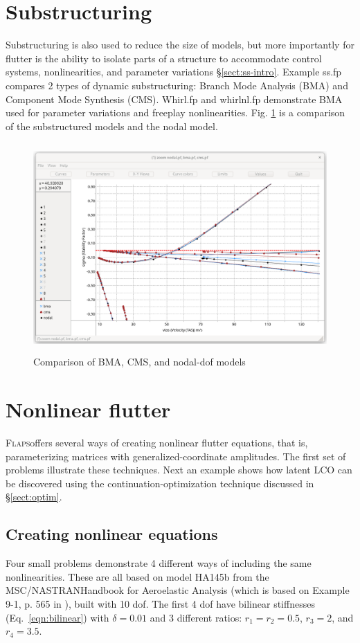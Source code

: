 \documentclass[11pt,openany,twoside]{book}
\numberwithin{equation}{section}		%
\newcommand{\Flaps}{\textsc{Flaps\:}}
\newcommand{\Nastran}{{\footnotesize{NASTRAN\:}}}
\newcommand{\Sectref}[1]{\S\ref{#1}}
\newcommand{\Eqn}[1]{Eq.\ \ref{#1}}  %
\newcommand{\Figref}[1]{Fig. \ref{#1}}  %
\begin{document}
\section{Substructuring}\label{ex:substructure}
Substructuring is also used to reduce the size of models, but more
importantly for flutter is the ability to isolate parts of a structure
to accommodate control systems, nonlinearities, and parameter variations
\Sectref{sect:ss-intro}.
Example ss.fp compares 2 types of dynamic substructuring: Branch Mode
Analysis (BMA) and Component Mode Synthesis (CMS).
Whirl.fp and whirlnl.fp demonstrate BMA used for parameter variations
and freeplay nonlinearities. \Figref{fig:ss-compare} is a comparison of the
substructured models and the nodal model.
\begin{figure}[ht]
		\includegraphics[height=8cm,width=12cm]{ss-compare.png}
	\centering
	\caption{Comparison of BMA, CMS, and nodal-dof models}\label{fig:ss-compare}
\end{figure}

\newpage
\section{Nonlinear flutter}\label{ex:nl1234}
\Flaps offers several ways of creating nonlinear flutter equations,
that is, parameterizing matrices with generalized-coordinate amplitudes.
The first set of problems illustrate these techniques. Next an example
shows how latent LCO can be discovered using the continuation-optimization
technique discussed in \Sectref{sect:optim}.

\subsection{Creating nonlinear equations}
Four small problems demonstrate 4 different ways of including the
same nonlinearities.
These are all based on model HA145b from the MSC/\Nastran Handbook
for Aeroelastic Analysis \cite{rodden2009msc} (which is based on
Example 9-1, p. 565 in \cite{bisplinghoff1955aeroelasticity}),
built with 10 dof.
The first 4 dof have bilinear stiffnesses (\Eqn{eqn:bilinear})
with $\delta = 0.01$ and 3 different ratios: $r_1 = r_2 = 0.5$,
$r_3 = 2$, and $r_4 = 3.5$.
\end{document}
